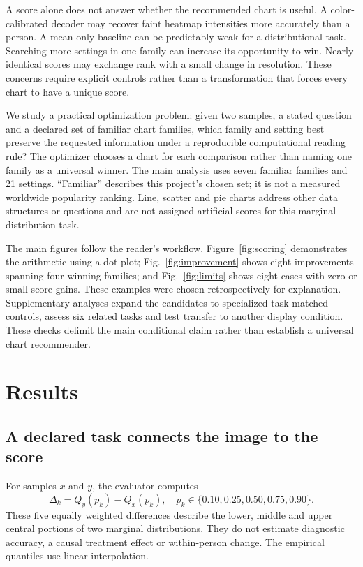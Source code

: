 \documentclass[11pt]{article}
\begin{document}
A score alone does not answer whether the recommended chart is useful. A color-calibrated decoder may recover faint heatmap intensities more accurately than a person. A mean-only baseline can be predictably weak for a distributional task. Searching more settings in one family can increase its opportunity to win. Nearly identical scores may exchange rank with a small change in resolution. These concerns require explicit controls rather than a transformation that forces every chart to have a unique score.

We study a practical optimization problem: given two samples, a stated question and a declared set of familiar chart families, which family and setting best preserve the requested information under a reproducible computational reading rule? The optimizer chooses a chart for each comparison rather than naming one family as a universal winner. The main analysis uses seven familiar families and 21 settings. ``Familiar'' describes this project's chosen set; it is not a measured worldwide popularity ranking. Line, scatter and pie charts address other data structures or questions and are not assigned artificial scores for this marginal distribution task.

The main figures follow the reader's workflow. Figure~\ref{fig:scoring} demonstrates the arithmetic using a dot plot; Fig.~\ref{fig:improvement} shows eight improvements spanning four winning families; and Fig.~\ref{fig:limits} shows eight cases with zero or small score gains. These examples were chosen retrospectively for explanation. Supplementary analyses expand the candidates to specialized task-matched controls, assess six related tasks and test transfer to another display condition. These checks delimit the main conditional claim rather than establish a universal chart recommender.

\section*{Results}
\subsection*{A declared task connects the image to the score}
For samples $x$ and $y$, the evaluator computes
\begin{equation}
\Delta_k=Q_y(p_k)-Q_x(p_k),\quad p_k\in\{0.10,0.25,0.50,0.75,0.90\}.
\label{eq:target}
\end{equation}
These five equally weighted differences describe the lower, middle and upper central portions of two marginal distributions. They do not estimate diagnostic accuracy, a causal treatment effect or within-person change. The empirical quantiles use linear interpolation.
\end{document}

